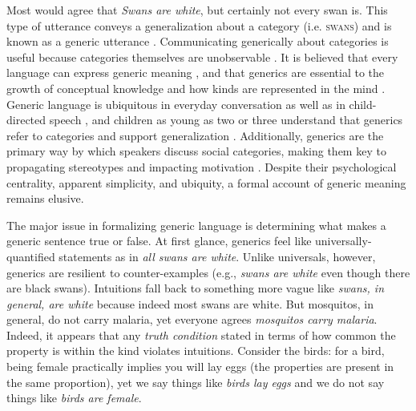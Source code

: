 \documentclass[12pt,letterpaper]{article}
\begin{document}
\newpage

Most would agree that \emph{Swans are white}, but certainly not every swan is.
This type of utterance conveys a generalization about a category (i.e. \textsc{swans}) and is known as a generic utterance \cite{Carlson1977,Leslie2008}.
Communicating generically about categories is useful because categories themselves are unobservable \cite{Markman1989}.
It is believed that every language can express generic meaning \cite{Behrens2005,Carlson1995}, and that generics are essential to the growth of conceptual knowledge \cite{Gelman2004} and how kinds are represented in the mind \cite{Leslie2008}.
Generic language is ubiquitous in everyday conversation as well as in child-directed speech \cite{Gelman2008}, and children as young as two or three understand that generics refer to categories and support generalization \cite{Cimpian2008}.
Additionally, generics are the primary way by which speakers discuss social categories, making them key to propagating stereotypes \cite{GelmanEtAl2004,Rhodes2012,Leslie2015} and impacting motivation \cite{Cimpian2010motivation}.
Despite their psychological centrality, apparent simplicity, and ubiquity, a formal account of generic meaning remains elusive.

The major issue in formalizing generic language is determining what makes a generic sentence true or false.
At first glance, generics feel like universally-quantified statements as in \emph{all swans are white}. 
Unlike universals, however, generics are resilient to counter-examples (e.g., \emph{swans are white} even though there are black swans). 
Intuitions fall back to something more vague like \emph{swans, in general, are white} because indeed most swans are white.
But mosquitos, in general, do not carry malaria, yet everyone agrees \emph{mosquitos carry malaria}.
Indeed, it appears that any \emph{truth condition} stated in terms of how common the property is within the kind violates intuitions.
Consider the birds: for a bird, being female practically implies you will lay eggs (the properties are present in the same proportion), yet we say things like \emph{birds lay eggs} and we do not say things like \emph{birds are female}.
\end{document}
